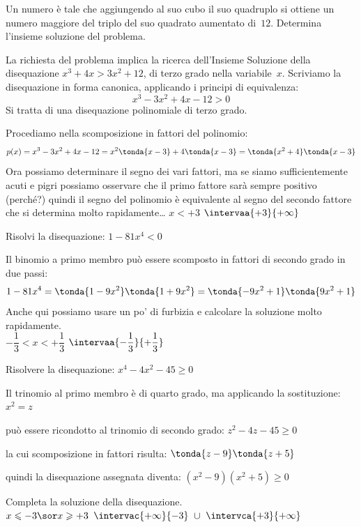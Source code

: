 \begin{esempio}{}{}
Un numero è tale che aggiungendo al suo cubo il suo quadruplo si ottiene 
un numero maggiore del triplo del suo quadrato aumentato di~\(12\). Determina 
l'insieme soluzione del problema.

La richiesta del problema implica la ricerca dell'Insieme Soluzione della 
disequazione \(x^3+4x>3x^2+12\), di terzo grado nella variabile~\(x\). 
Scriviamo la disequazione in forma canonica, applicando i principi di 
equivalenza: 
\[x^3-3x^2+4x-12>0\] 
Si tratta di una disequazione polinomiale di terzo grado.

Procediamo nella scomposizione in fattori del polinomio:
\[p(x)=x^3-3x^2+4x-12 = x^2 \tonda{x-3}+4 \tonda{x-3} =
      \tonda{x^2+4} \tonda{x-3}\]
Ora possiamo determinare il segno dei vari fattori, ma se siamo 
sufficientemente acuti e pigri possiamo osservare che il primo fattore sarà 
sempre positivo (perché?) quindi il segno del polinomio è equivalente al 
segno del secondo fattore che si determina molto rapidamente\dots
\inssol
  {}
  {\(x < +3\)}
  {\(\intervaa{+3}{+\infty}\)}
\end{esempio}

\begin{esempio}{}{}
Risolvi la disequazione: \(1-81x^4<0\)

Il binomio a primo membro può essere scomposto in fattori di secondo grado  
in due passi:
\[1-81x^4 = \tonda{1-9x^2}\tonda{1+9x^2}=
  \tonda{-9x^2+1}\tonda{9x^2+1}\]
Anche qui possiamo usare un po' di furbizia e calcolare la soluzione molto 
rapidamente.\\
\inssol
  {}
  {\(-\dfrac{1}{3} < x < +\dfrac{1}{3}\)}
  {\(\intervaa{-\dfrac{1}{3}}{+\dfrac{1}{3}}\)}
\end{esempio}

\begin{esempio}{}{}
Risolvere la disequazione: \(x^4-4x^2-45 \geqslant 0\)

Il trinomio al primo membro è di quarto grado, ma applicando la 
sostituzione: 
\(x^2=z\)

può essere ricondotto al trinomio di secondo grado:
\(z^2-4z-45 \geqslant 0\)

la cui scomposizione in fattori risulta:
\(\tonda{z-9}\tonda{z+5}\)

quindi la disequazione assegnata diventa: 
\((x^2-9)(x^2+5) \geqslant 0\)

Completa la soluzione della disequazione.\\
\inssol
  {}
   {\(x \leqslant -3 \sor x \geqslant +3\)}
   {\(\intervac{+\infty}{-3}~\cup~\intervca{+3}{+\infty}\)}
\end{esempio}

